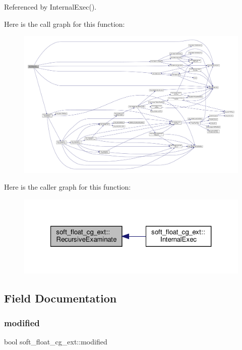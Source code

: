Referenced by Internal\+Exec().

Here is the call graph for this function\+:
\nopagebreak
\begin{figure}[H]
\begin{center}
\leavevmode
\includegraphics[width=350pt]{d2/db0/classsoft__float__cg__ext_a3046064995739c8e40511505679140ae_cgraph}
\end{center}
\end{figure}
Here is the caller graph for this function\+:
\nopagebreak
\begin{figure}[H]
\begin{center}
\leavevmode
\includegraphics[width=321pt]{d2/db0/classsoft__float__cg__ext_a3046064995739c8e40511505679140ae_icgraph}
\end{center}
\end{figure}


\subsection{Field Documentation}
\mbox{\label{classsoft__float__cg__ext_a65977082ca0b0daee164b8b245685f57}} 
\subsubsection{\texorpdfstring{modified}{modified}}
{\footnotesize\ttfamily bool soft\+\_\+float\+\_\+cg\+\_\+ext\+::modified\hspace{0.3cm}{\ttfamily [protected]}}



